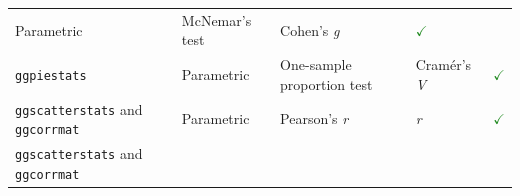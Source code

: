 \documentclass[
]{article}
\begin{document}
\begin{longtable}[]{@{}lllll@{}}
\begin{minipage}[t]{0.16\columnwidth}
Parametric\strut
\end{minipage} & \begin{minipage}[t]{0.31\columnwidth}\raggedright
McNemar's test\strut
\end{minipage} & \begin{minipage}[t]{0.12\columnwidth}\raggedright
Cohen's \emph{g}\strut
\end{minipage} & \begin{minipage}[t]{0.07\columnwidth}\raggedright
\textcolor{ForestGreen}{$\checkmark$}\strut
\end{minipage}\tabularnewline
\begin{minipage}[t]{0.20\columnwidth}\raggedright
\texttt{ggpiestats}\strut
\end{minipage} & \begin{minipage}[t]{0.16\columnwidth}\raggedright
Parametric\strut
\end{minipage} & \begin{minipage}[t]{0.31\columnwidth}\raggedright
One-sample proportion test\strut
\end{minipage} & \begin{minipage}[t]{0.12\columnwidth}\raggedright
Cramér's \emph{V}\strut
\end{minipage} & \begin{minipage}[t]{0.07\columnwidth}\raggedright
\textcolor{ForestGreen}{$\checkmark$}\strut
\end{minipage}\tabularnewline
\begin{minipage}[t]{0.20\columnwidth}\raggedright
\texttt{ggscatterstats} and \texttt{ggcorrmat}\strut
\end{minipage} & \begin{minipage}[t]{0.16\columnwidth}\raggedright
Parametric\strut
\end{minipage} & \begin{minipage}[t]{0.31\columnwidth}\raggedright
Pearson's \emph{r}\strut
\end{minipage} & \begin{minipage}[t]{0.12\columnwidth}\raggedright
\emph{r}\strut
\end{minipage} & \begin{minipage}[t]{0.07\columnwidth}\raggedright
\textcolor{ForestGreen}{$\checkmark$}\strut
\end{minipage}\tabularnewline
\begin{minipage}[t]{0.20\columnwidth}\raggedright
\texttt{ggscatterstats} and \texttt{ggcorrmat}\strut
\end{minipage} & \begin{minipage}[t]{0.16\columnwidth}\raggedright

\end{minipage}
\end{longtable}
\end{document}
